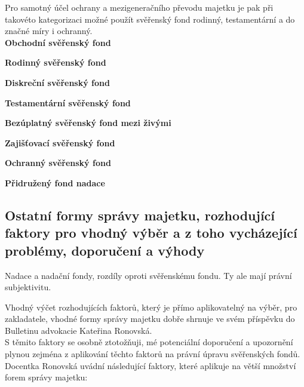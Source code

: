 \documentclass{article}
\begin{document}
Pro samotný účel ochrany a mezigeneračního převodu majetku je pak při takovéto kategorizaci možné použít svěřenský fond rodinný, testamentární a do značné míry i ochranný.\\

\textbf{Obchodní svěřenský fond}

\textbf{Rodinný svěřenský fond}

\textbf{Diskreční svěřenský fond}

\textbf{Testamentární svěřenský fond}

\textbf{Bezúplatný svěřenský fond mezi živými}

\textbf{Zajišťovací svěřenský fond}

\textbf{Ochranný svěřenský fond}

\textbf{Přidružený fond nadace}

\subsection{Ostatní formy správy majetku, rozhodující faktory pro vhodný výběr a z toho vycházející problémy, doporučení a výhody}

Nadace a nadační fondy, rozdíly oproti svěřenskému fondu. Ty ale mají právní subjektivitu.


Vhodný výčet rozhodujících faktorů, který je přímo aplikovatelný na výběr, pro zakladatele, vhodné formy správy majetku dobře shrnuje ve svém příspěvku do Bulletinu advokacie Kateřina Ronovská.\\

S těmito faktory se osobně ztotožňuji, mé potenciální doporučení a upozornění plynou zejména z aplikování těchto faktorů na právní úpravu svěřenských fondů.\\

Docentka Ronovská uvádní následující faktory, které aplikuje na větší množství forem správy majetku:
\end{document}
